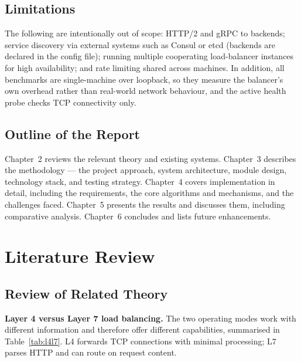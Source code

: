 \documentclass[11pt,a4paper]{report}
\begin{document}
\section{Limitations}
The following are intentionally out of scope: HTTP/2 and gRPC to backends; service discovery
via external systems such as Consul or etcd (backends are declared in the config file);
running multiple cooperating load-balancer instances for high availability; and rate limiting
shared across machines. In addition, all benchmarks are single-machine over loopback, so they
measure the balancer's own overhead rather than real-world network behaviour, and the active
health probe checks TCP connectivity only.

\section{Outline of the Report}
Chapter~2 reviews the relevant theory and existing systems. Chapter~3 describes the
methodology --- the project approach, system architecture, module design, technology stack,
and testing strategy. Chapter~4 covers implementation in detail, including the requirements,
the core algorithms and mechanisms, and the challenges faced. Chapter~5 presents the results
and discusses them, including comparative analysis. Chapter~6 concludes and lists future
enhancements.

\chapter{Literature Review}

\section{Review of Related Theory}

\textbf{Layer 4 versus Layer 7 load balancing.} The two operating modes work with different
information and therefore offer different capabilities, summarised in Table~\ref{tab:l4l7}. L4
forwards TCP connections with minimal processing; L7 parses HTTP and can route on request
content.
\end{document}
